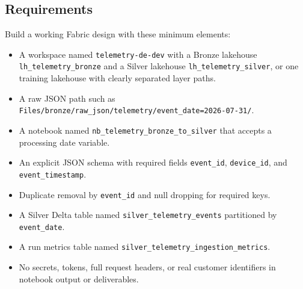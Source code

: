 \subsection*{Requirements}
Build a working Fabric design with these minimum elements:
\begin{itemize}
    \item A workspace named \texttt{telemetry-de-dev} with a Bronze lakehouse \texttt{lh\_telemetry\_bronze} and a Silver lakehouse \texttt{lh\_telemetry\_silver}, or one training lakehouse with clearly separated layer paths.
    \item A raw JSON path such as \texttt{Files/bronze/raw\_json/telemetry/event\_date=2026-07-31/}.
    \item A notebook named \texttt{nb\_telemetry\_bronze\_to\_silver} that accepts a processing date variable.
    \item An explicit JSON schema with required fields \texttt{event\_id}, \texttt{device\_id}, and \texttt{event\_timestamp}.
    \item Duplicate removal by \texttt{event\_id} and null dropping for required keys.
    \item A Silver Delta table named \texttt{silver\_telemetry\_events} partitioned by \texttt{event\_date}.
    \item A run metrics table named \texttt{silver\_telemetry\_ingestion\_metrics}.
    \item No secrets, tokens, full request headers, or real customer identifiers in notebook output or deliverables.
\end{itemize}

